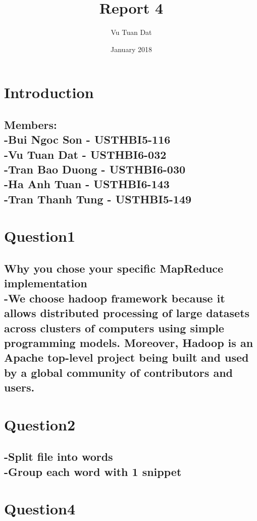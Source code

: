 \documentclass{article}
\title{Report 4}
\author{Vu Tuan Dat }
\date{January 2018}
\begin{document}
\maketitle

\section{Introduction}

\subsection{Members:\\-Bui Ngoc Son - USTHBI5-116\\-Vu Tuan Dat - USTHBI6-032\\-Tran Bao Duong - USTHBI6-030\\-Ha Anh Tuan - USTHBI6-143\\-Tran Thanh Tung - USTHBI5-149}
\section{Question1}
\subsection{ Why you chose your specific MapReduce implementation\\
-We choose hadoop framework because it allows distributed processing of large datasets across clusters of computers using simple programming models. Moreover, Hadoop is an Apache top-level project being built and used by a global community of contributors and users.
}
\section{Question2}
\subsection{-Split file into words\\
-Group each word with 1 snippet}
\section{Question4}
\end{document}
